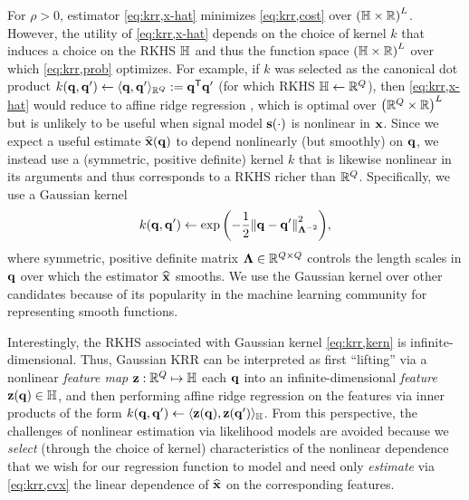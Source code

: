 For $\rho>0$, 
estimator \eqref{eq:krr,x-hat} minimizes \eqref{eq:krr,cost}
over $\paren{\hilb \times \real}^L$.
However, the utility of \eqref{eq:krr,x-hat}
depends on the choice of kernel $k$
that induces a choice on the RKHS $\mathbb{H}$
and thus the function space $\paren{\hilb \times \real}^L$
over which \eqref{eq:krr,prob} optimizes.
For example, if $k$ was selected as the canonical dot product 
$k(\mathbf{q},\mathbf{q}') \gets \langle \mathbf{q},\mathbf{q}' \rangle_{\mathbb{R}^{Q}} := \mathbf{q}^{\mathsf{T}} \mathbf{q}'$
(for which RKHS $\mathbb{H} \gets \mathbb{R}^{Q}$),
then \eqref{eq:krr,x-hat} would reduce 
to affine ridge regression \cite{hoerl:70:rrb},
which is optimal over $\paren{\reals{Q} \times \real}^L$
but is unlikely to be useful when signal model $\bms\paren{\cdot}$ is nonlinear in $\mathbf{x}$.
Since we expect a useful estimate $\est{\bmx}\paren{\bmq}$ 
to depend nonlinearly (but smoothly) on $\mathbf{q}$,
we instead use a 
(symmetric, positive definite) kernel
$k$ that is likewise nonlinear in its arguments
and thus corresponds to a RKHS richer than $\mathbb{R}^{Q}$. 
Specifically, we use a Gaussian kernel
\begin{align}
	k(\bmq,\bmq') \gets \expa{-\frac{1}{2}\norm{\bmq-\bmq'}^2_{\bmL^{-2}}},
	\label{eq:krr,kern}
\end{align}
where symmetric, positive definite matrix
$\boldsymbol{\Lambda} \in \mathbb{R}^{Q \times Q}$ 
controls the length scales in $\mathbf{q}$ over which 
the estimator $\widehat{\mathbf{x}}$ smooths.
We use the Gaussian kernel
over other candidates
because of its popularity
in the machine learning community 
for representing smooth functions.

Interestingly, 
the RKHS associated 
with Gaussian kernel \eqref{eq:krr,kern}
is infinite-dimensional.
Thus, 
Gaussian KRR
can be interpreted as 
first ``lifting'' 
via a nonlinear \emph{feature map} 
$\mathbf{z} : \mathbb{R}^{Q} \mapsto \mathbb{H}$ 
each $\mathbf{q}$ 
into an infinite-dimensional \emph{feature} $\bmza{\bmq} \in \hilb$,
and then performing affine ridge regression
on the features
via inner products of the form
$k(\bmq,\bmq') \gets \innprod{\bmza{\bmq}}{\bmza{\bmq'}}_{\hilb}$.
From this perspective,
the challenges of nonlinear estimation 
via likelihood models
are avoided 
because we \emph{select} 
(through the choice of kernel) 
characteristics of the nonlinear dependence
that we wish 
for our regression function to model
and need only \emph{estimate} via \eqref{eq:krr,cvx} 
the linear dependence
of $\widehat{\mathbf{x}}$ on the corresponding features.

